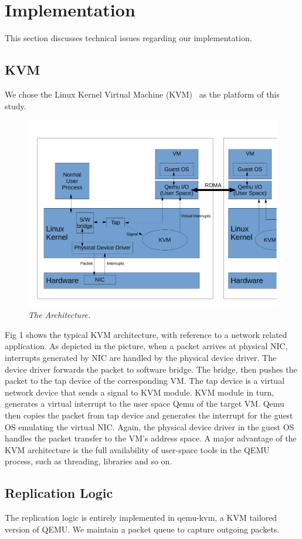  \section{Implementation} \label{sec:impl}

This section discusses technical issues regarding our implementation.

\subsection{KVM}\label{sec:kvm}
We chose the Linux Kernel Virtual Machine (KVM)~\cite{kivity2007kvm} 
as the platform of this study.

\begin{figure}[t]
\centering
\includegraphics[width=.47\textwidth]{figures/arch}
\vspace{-.2in}
\caption{{\em The \xxx Architecture.}} \label{fig:arc}
\vspace{.05in}
\end{figure}

Fig 1 shows the typical KVM architecture, with reference to a network related 
application. As depicted in the picture, when a packet arrives at physical NIC, 
interrupts generated by NIC are handled by the physical device driver. The device 
driver forwards the packet to software bridge. The bridge, then pushes the packet 
to the tap device of the corresponding VM. The tap device is a virtual network 
device that sends a signal to KVM module. KVM module in turn, generates a virtual 
interrupt to the user space Qemu of the target VM. Qemu then copies the packet from 
tap device and generates the interrupt for the guest OS emulating the virtual NIC. 
Again, the physical device driver in the guest OS handles the packet transfer to 
the VM’s address space. A major advantage of the KVM architecture is the full 
availability of user-space tools in the QEMU process, such as threading, libraries 
and so on.
\subsection{Replication Logic}\label{sec:Replication}
The replication logic is entirely implemented in qemu-kvm, a KVM tailored version of QEMU.
We maintain a packet queue to capture outgoing packets.
